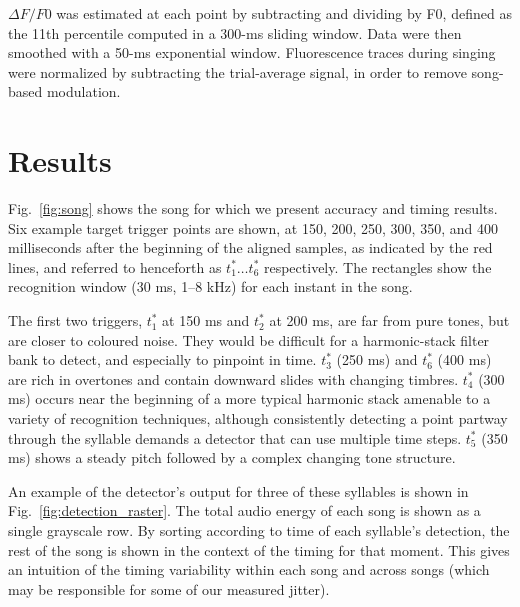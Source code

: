 \documentclass[10pt,letterpaper]{article}
\newcommand\fig[1]{Fig.~\ref{#1}}
\begin{document}
$\Delta F / F0$ was estimated at each point by subtracting and dividing by 
F0, defined as the 11th percentile computed in a 300-ms sliding window. 
Data were then smoothed with a 50-ms exponential window. Fluorescence traces
during singing were normalized by subtracting the trial-average signal, in 
order to remove song-based modulation.

\section{Results}
\label{sec:results}

\fig{fig:song} shows the song for which we present accuracy and timing results.  Six
example target trigger points are shown, at 150, 200, 250, 300, 350,
and 400 milliseconds after the beginning of the aligned samples, as
indicated by the red lines, and referred to henceforth as $t^*_1\ldots
t^*_6$ respectively.  The rectangles show the recognition window (30
ms, 1--8 kHz) for each instant in the song.

The first two triggers, $t^*_1$ at 150 ms and $t^*_2$ at 200 ms, are
far from pure tones, but are closer to coloured noise.  They would be
difficult for a harmonic-stack filter bank to detect, and especially to
pinpoint in time.  $t^*_3$ (250 ms) and $t^*_6$ (400 ms) are rich in
overtones and contain downward slides with changing timbres.  $t^*_4$
(300 ms) occurs near the beginning of a more typical harmonic stack amenable to a variety of
recognition techniques, although consistently detecting a point
partway through the syllable demands a detector that can use multiple
time steps.  $t^*_5$ (350 ms) shows a steady pitch followed by a
complex changing tone structure.

An example of the detector's output for three of these syllables is
shown in \fig{fig:detection_raster}.  The total audio energy of each song is shown as a single grayscale row.  By sorting according to time of
each syllable's detection, the rest of the song is shown in the
context of the timing for that moment.  This gives an intuition of the
timing variability within each song and across songs (which may be responsible
for some of our measured jitter).
\end{document}
